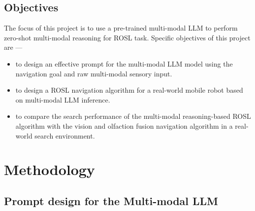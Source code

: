 \subsection{Objectives}\label{Subsec:LLMObjectives}
The focus of this project is to use a pre-trained multi-modal LLM to perform zero-shot multi-modal reasoning for ROSL task. Specific objectives of this project are ---
\begin{itemize}
    \item to design an effective prompt for the multi-modal LLM model using the navigation goal and raw multi-modal sensory input.
    \item to design a ROSL navigation algorithm for a real-world mobile robot based on multi-modal LLM inference.
    \item to compare the search performance of the multi-modal reasoning-based ROSL algorithm with the vision and olfaction fusion navigation algorithm in a real-world search environment.
\end{itemize}

\section{Methodology}
\subsection{Prompt design for the Multi-modal LLM}\label{Subsec:LLMPrompt}

